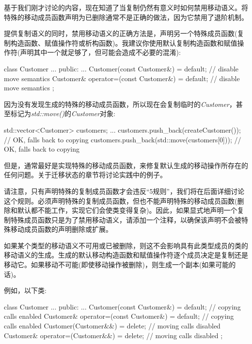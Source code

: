 
基于我们刚才讨论的内容，现在知道了当复制仍然有意义时如何禁用移动语义。将特殊的移动成员函数声明为已删除通常不是正确的做法，因为它禁用了退阶机制。\par

提供复制语义的同时，禁用移动语义的正确方法是，声明另一个特殊成员函数(复制构造函数、赋值操作符或析构函数)。我建议你使用默认复制构造函数和赋值操作符(声明其中一个就足够了，但可能会造成不必要的混淆):\par

\begin{codebox}[cpp]
class Customer {
  ...
public:
  ...
  Customer(const Customer&) = default; // disable move semantics
  Customer& operator=(const Customer&) = default; // disable move semantics
};
\end{codebox}

因为没有发现生成的特殊的移动成员函数，所以现在会复制临时的\textit{Customer}，甚至标记为\textit{std::move()}的\textit{Customer}对象:\par

\begin{codebox}[cpp]
std::vector<Customer> customers;
...
customers.push_back(createCustomer()); // OK, falls back to copying
customers.push_back(std::move(customers[0])); // OK, falls back to copying
\end{codebox}

但是，通常最好是实现特殊的移动成员函数，来修复默认生成的移动操作所存在的任何问题。关于迁移状态的章节将讨论实践中的例子。\par

请注意，只有声明特殊的复制成员函数才会违反“5规则”，我们将在后面详细讨论这个规则。必须声明特殊的复制成员函数，但也不能声明特殊的移动成员函数(删除和默认都不能工作，实现它们会使类变得复杂)。因此，如果显式地声明一个复制特殊成员函数只是为了禁用移动语义，请添加一个注释，以确保该声明不会被特殊移动成员函数的声明删除或扩展。\par


如果某个类型的移动语义不可用或已被删除，则这不会影响具有此类型成员的类的移动语义的生成。生成的默认移动构造函数和赋值操作符逐个成员决定是复制还是移动它。如果移动不可能(即使移动操作被删除)，则生成一个副本(如果可能的话)。\par

例如，以下类:\par

\begin{codebox}[cpp]
class Customer {
  ...
public:
  ...
  Customer(const Customer&) = default; // copying calls enabled
  Customer& operator=(const Customer&) = default; // copying calls enabled
  Customer(Customer&&) = delete; // moving calls disabled
  Customer& operator=(Customer&&) = delete; // moving calls disabled
};
\end{codebox}

